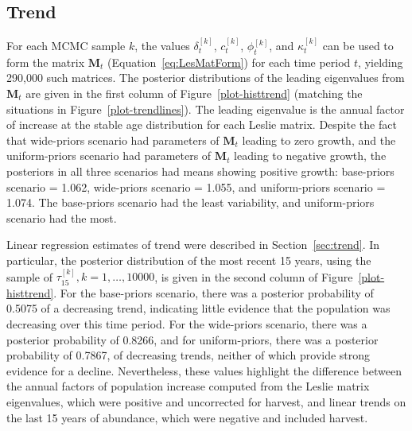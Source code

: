 \documentclass[12pt, titlepage]{article}\usepackage[]{graphicx}\usepackage[]{color}
\def\bM{\mathbf{M}}
\begin{document}




\subsection{Trend}

For each MCMC sample $k$, the values $\delta_t^{[k]}$, $c_t^{[k]}$, $\phi_t^{[k]}$, and $\kappa_t^{[k]}$ can be used to form the matrix $\bM_t$ (Equation~\ref{eq:LesMatForm}) for each time period $t$, yielding 290,000 such matrices.  The posterior distributions of the leading eigenvalues from $\bM_t$ are given in the first column of Figure~\ref{plot-histtrend} (matching the situations in Figure~\ref{plot-trendlines}). The leading eigenvalue is the annual factor of increase at the stable age distribution for each Leslie matrix. Despite the fact that wide-priors scenario had parameters of $\bM_t$ leading to zero growth, and the uniform-priors scenario had parameters of $\bM_t$ leading to negative growth, the posteriors in all three scenarios had means showing positive growth: base-priors scenario  = 1.062, wide-priors scenario = 1.055, and uniform-priors scenario = 1.074.  The base-priors scenario had the least variability, and uniform-priors scenario had the most.

Linear regression estimates of trend were described in Section~\ref{sec:trend}.  In particular, the posterior distribution of the most recent 15 years, using the sample of $\tau^{[k]}_{15}, k = 1,\ldots,10000$, is given in the second column of Figure~\ref{plot-histtrend}.  For the base-priors scenario, there was a posterior probability of 0.5075 of a decreasing trend, indicating little evidence that the population was decreasing over this time period. For the wide-priors scenario, there was a posterior probability of 0.8266, and for uniform-priors, there was a posterior probability of 0.7867, of decreasing trends, neither of which provide strong evidence for a decline.  Nevertheless, these values highlight the difference between the annual factors of population increase computed from the Leslie matrix eigenvalues, which were positive and uncorrected for harvest, and linear trends on the last 15 years of abundance, which were negative and included harvest. 
\end{document}
